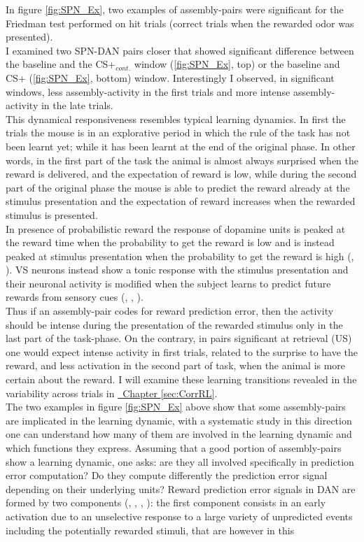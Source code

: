 In figure \ref{fig:SPN_Ex}, two examples of assembly-pairs were significant for the Friedman test performed on hit trials (correct trials when the rewarded odor was presented).\\I examined two SPN-DAN pairs closer that showed significant difference between the baseline and the CS+$_{cont.}$ window (\ref{fig:SPN_Ex}, top) or the baseline and CS+ (\ref{fig:SPN_Ex}, bottom) window. Interestingly I observed, in significant windows, less assembly-activity in the first trials and more intense assembly-activity in the late trials.\\This dynamical responsiveness resembles typical learning dynamics. In first the trials the mouse is in an explorative period in which the rule of the task has not been learnt yet; while it has been learnt at the end of the original phase. In other words, in the first part of the task the animal is almost always surprised when the reward is delivered, and the expectation of reward is low, while during the second part of the original phase the mouse is able to predict the reward already at the stimulus presentation and the expectation of reward increases when the rewarded stimulus is presented.\\In presence of probabilistic reward the response of dopamine units is peaked at the reward time when the probability to get the reward is low and is instead peaked at stimulus presentation when the probability to get the reward is high (\cite{Schultz1992}, \cite{Schultz} \cite{Fiorillo}). VS neurons instead show a tonic response with the stimulus presentation and their neuronal activity is modified when the subject learns to predict future rewards from sensory cues (\cite{Pagnoni}, \cite{Schultz2000}, \cite{Radua}).\\Thus if an assembly-pair codes for reward prediction error, then the activity should be intense during the presentation of the rewarded stimulus only in the last part of the task-phase. On the contrary, in pairs significant at retrieval (US) one would expect intense activity in first trials, related to the surprise to have the reward, and less activation in the second part of task, when the animal is more certain about the reward. I will examine these learning transitions revealed in the variability across trials in \hyperref[sec:CorrRL]{~Chapter \ref*{sec:CorrRL}}.\\The two examples in figure \ref{fig:SPN_Ex} above show that some assembly-pairs are implicated in the learning dynamic, with a systematic study in this direction one can understand how many of them are involved in the learning dynamic and which functions they express. Assuming that a good portion of assembly-pairs show a learning dynamic, one asks: are they all involved specifically in prediction error computation? Do they compute differently the prediction error signal depending on their underlying units? Reward prediction error signals in DAN are formed by two components (\cite{Tobler2003}, \cite{Nomoto2010}, \cite{Fiorillo2013}, \cite{Schultz2016}): the first component consists in an early activation due to an unselective response to a large variety of unpredicted events including the potentially rewarded stimuli, that are however in this 